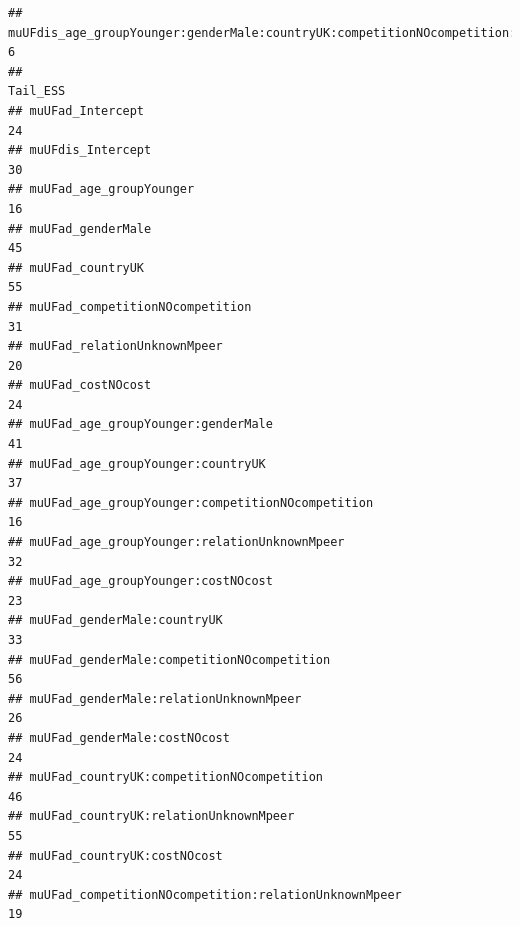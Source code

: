 \documentclass[
]{article}
\begin{document}
\begin{verbatim}
## muUFdis_age_groupYounger:genderMale:countryUK:competitionNOcompetition:relationUnknownMpeer:costNOcost        6
##                                                                                                        Tail_ESS
## muUFad_Intercept                                                                                             24
## muUFdis_Intercept                                                                                            30
## muUFad_age_groupYounger                                                                                      16
## muUFad_genderMale                                                                                            45
## muUFad_countryUK                                                                                             55
## muUFad_competitionNOcompetition                                                                              31
## muUFad_relationUnknownMpeer                                                                                  20
## muUFad_costNOcost                                                                                            24
## muUFad_age_groupYounger:genderMale                                                                           41
## muUFad_age_groupYounger:countryUK                                                                            37
## muUFad_age_groupYounger:competitionNOcompetition                                                             16
## muUFad_age_groupYounger:relationUnknownMpeer                                                                 32
## muUFad_age_groupYounger:costNOcost                                                                           23
## muUFad_genderMale:countryUK                                                                                  33
## muUFad_genderMale:competitionNOcompetition                                                                   56
## muUFad_genderMale:relationUnknownMpeer                                                                       26
## muUFad_genderMale:costNOcost                                                                                 24
## muUFad_countryUK:competitionNOcompetition                                                                    46
## muUFad_countryUK:relationUnknownMpeer                                                                        55
## muUFad_countryUK:costNOcost                                                                                  24
## muUFad_competitionNOcompetition:relationUnknownMpeer                                                         19

\end{verbatim}
\end{document}
